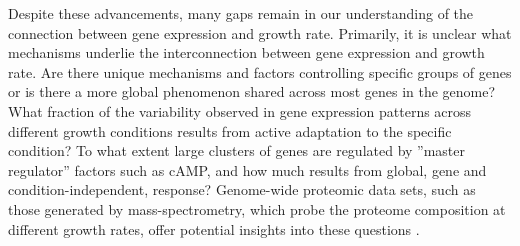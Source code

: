 Despite these advancements, many gaps remain in our understanding of the connection between gene expression and growth rate.
Primarily, it is unclear what mechanisms underlie the interconnection between gene expression and growth rate.
Are there unique mechanisms and factors controlling specific groups of genes \cite{You_2013,Peebo_2015,Hui_2015} or is there a more global phenomenon shared across most genes in the genome?
What fraction of the variability observed in gene expression patterns across different growth conditions results from active adaptation to the specific condition?
To what extent large clusters of genes are regulated by ''master regulator'' factors such as cAMP, and how much results from global, gene and condition-independent, response?
Genome-wide proteomic data sets, such as those generated by mass-spectrometry, which probe the proteome composition at different growth rates, offer potential insights into these questions \cite{Valgepea2013,Heinemann2015,Hui_2015,Peebo_2015}.